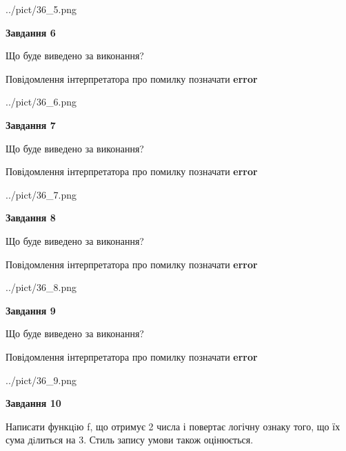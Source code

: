 \documentclass[12pt, ukrainian]{article}
\begin{document}
{\begin {large}
\begin{center}
	{../pict/36_5.png}
\end{center}
\newpage

{\begin {center}\textbf{Завдання 6}\end {center}}\par
Що буде виведено за виконання? \par
Повідомлення інтерпретатора про помилку позначати \textbf{error}

\begin{center}
	{../pict/36_6.png}
\end{center}
\newpage

{\begin {center}\textbf{Завдання 7}\end {center}}\par
Що буде виведено за виконання? \par
Повідомлення інтерпретатора про помилку позначати \textbf{error}

\begin{center}
	{../pict/36_7.png}
\end{center}
\newpage

{\begin {center}\textbf{Завдання 8}\end {center}}\par
Що буде виведено за виконання? \par
Повідомлення інтерпретатора про помилку позначати \textbf{error}

\begin{center}
	{../pict/36_8.png}
\end{center}
\newpage

{\begin {center}\textbf{Завдання 9}\end {center}}\par
Що буде виведено за виконання? \par
Повідомлення інтерпретатора про помилку позначати \textbf{error}

\begin{center}
	{../pict/36_9.png}
\end{center}
\newpage

{\begin {center}\textbf{Завдання 10}\end {center}}\par

Написати функцiю f, що отримує 2 числа і повертає логічну ознаку того, що їх сума дiлиться на 3. Стиль запису умови також оцінюється.\par
\newpage

\end {large}}
\end{document}
